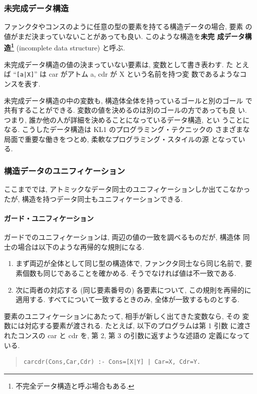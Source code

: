\documentclass[a4,titlepage]{jsreport}
\def\em{\bf\dg}
\let\dg\bf
\newenvironment{program}{\begin{quote}}{\end{quote}}
\begin{document}
\subsubsection{未完成データ構造}
ファンクタやコンスのように任意の型の要素を持てる構造データの場合, 要素
の値がまだ決まっていないことがあっても良い.  このような構造を{\em 未完
成データ構造\footnote{不完全データ構造と呼ぶ場合もある.}} (incomplete
data structure) と呼ぶ.  

未完成データ構造の値の決まっていない要素は, 変数として書き表わす.  た
とえば ``\verb^[a|X]^'' は car がアトム a, cdr が X という名前を持つ変
数であるようなコンスを表す.

未完成データ構造の中の変数も, 構造体全体を持っているゴールと別のゴール
で共有することができる. 変数の値を決めるのは別のゴールの方であっても良
い.  つまり, 誰か他の人が詳細を決めることになっているデータ構造, とい
うことになる.  こうしたデータ構造は KL1 のプログラミング・テクニックの
さまざまな局面で重要な働きをつとめ, 柔軟なプログラミング・スタイルの源
となっている.

\subsubsection{構造データのユニフィケーション}
ここまででは, アトミックなデータ同士のユニフィケーションしか出てこなかっ
たが, 構造を持つデータ同士もユニフィケーションできる.

\paragraph{ガード・ユニフィケーション}
ガードでのユニフィケーションは, 両辺の値の一致を調べるものだが, 構造体
同士の場合は以下のような再帰的な規則になる.
\begin{enumerate}
\item
まず両辺が全体として同じ型の構造体で, ファンクタ同士なら同じ名前で, 要
素個数も同じであることを確かめる.  そうでなければ値は不一致である.
\item
次に両者の対応する (同じ要素番号の) 各要素について, この規則を再帰的に
適用する.  すべてについて一致するときのみ, 全体が一致するものとする.
\end{enumerate}

要素のユニフィケーションにあたって, 相手が新しく出てきた変数なら, その
変数には対応する要素が渡される.  たとえば, 以下のプログラムは第 1 引数
に渡されたコンスの car と cdr を, 第 2, 第 3 の引数に返すような述語の
定義になっている.
\begin{program}
\begin{verbatim}
carcdr(Cons,Car,Cdr) :- Cons=[X|Y] | Car=X, Cdr=Y.
\end{verbatim}
\end{program}
\end{document}
